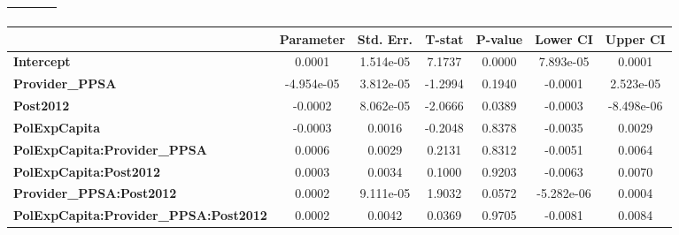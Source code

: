 \begin{center}
\begin{tabular}{lclc}
\textbf{}                                     &                    & \textbf{                     }   &                  \\
\bottomrule
\end{tabular}
\begin{tabular}{lcccccc}
                                              & \textbf{Parameter} & \textbf{Std. Err.} & \textbf{T-stat} & \textbf{P-value} & \textbf{Lower CI} & \textbf{Upper CI}  \\
\midrule
\textbf{Intercept}                            &       0.0001       &     1.514e-05      &      7.1737     &      0.0000      &     7.893e-05     &       0.0001       \\
\textbf{Provider\_PPSA}                       &     -4.954e-05     &     3.812e-05      &     -1.2994     &      0.1940      &      -0.0001      &     2.523e-05      \\
\textbf{Post2012}                             &      -0.0002       &     8.062e-05      &     -2.0666     &      0.0389      &      -0.0003      &     -8.498e-06     \\
\textbf{PolExpCapita}                         &      -0.0003       &       0.0016       &     -0.2048     &      0.8378      &      -0.0035      &       0.0029       \\
\textbf{PolExpCapita:Provider\_PPSA}          &       0.0006       &       0.0029       &      0.2131     &      0.8312      &      -0.0051      &       0.0064       \\
\textbf{PolExpCapita:Post2012}                &       0.0003       &       0.0034       &      0.1000     &      0.9203      &      -0.0063      &       0.0070       \\
\textbf{Provider\_PPSA:Post2012}              &       0.0002       &     9.111e-05      &      1.9032     &      0.0572      &     -5.282e-06    &       0.0004       \\
\textbf{PolExpCapita:Provider\_PPSA:Post2012} &       0.0002       &       0.0042       &      0.0369     &      0.9705      &      -0.0081      &       0.0084       \\
\bottomrule
\end{tabular}
\end{center}